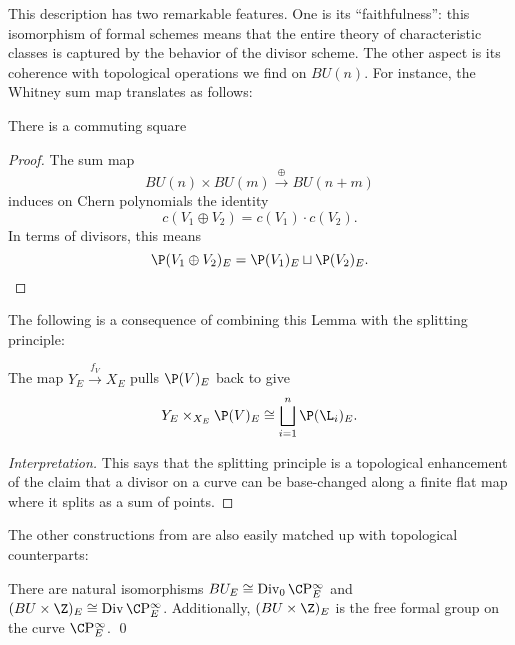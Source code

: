 This description has two remarkable features.  One is its ``faithfulness'': this isomorphism of formal schemes means that the entire theory of characteristic classes is captured by the behavior of the divisor scheme.  The other aspect is its coherence with topological operations we find on \(BU(n)\).  For instance, the Whitney sum map translates as follows:

\begin{lemma}\label{WhitneySumOfDivisors}
There is a commuting square
\begin{center}
\end{center}
\end{lemma}
\begin{proof}
The sum map \[BU(n) \times BU(m) \xrightarrow\oplus BU(n+m)\] induces on Chern polynomials the identity~\cite[Theorem 16.2.d]{Switzer} \[c(V_1 \oplus V_2) = c(V_1) \cdot c(V_2).\]  In terms of divisors, this means \[\P(V_1 \oplus V_2)_E = \P(V_1)_E \sqcup \P(V_2)_E. \qedhere\]
\end{proof}

The following is a consequence of combining this Lemma with the splitting principle:

\begin{corollary}
The map \(Y_E \xrightarrow{f_V} X_E\) pulls \(\P(V)_E\) back to give \[Y_E \times_{X_E} \P(V)_E \cong \bigsqcup_{i=1}^n \P(\L_i)_E.\]
\end{corollary}
\begin{proof}[Interpretation]
This says that the splitting principle is a topological enhancement of the claim that a divisor on a curve can be base-changed along a finite flat map where it splits as a sum of points.
\end{proof}

The other constructions from  are also easily matched up with topological counterparts:

\begin{corollary}\label{ECohomBUIsFree}
There are natural isomorphisms \(BU_E \cong \Div_0 \CP^\infty_E\) and \((BU \times \Z)_E \cong \Div \CP^\infty_E\). Additionally, \((BU \times \Z)_E\) is the free formal group on the curve \(\CP^\infty_E\). \qed
\end{corollary}

